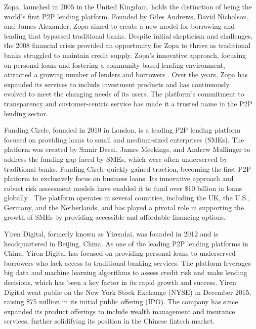 \documentclass{article}
\begin{document}
Zopa, launched in 2005 in the United Kingdom, holds the distinction of being the world's first P2P lending platform. Founded by Giles Andrews, David Nicholson, and James Alexander, Zopa aimed to create a new model for borrowing and lending that bypassed traditional banks. Despite initial skepticism and challenges, the 2008 financial crisis provided an opportunity for Zopa to thrive as traditional banks struggled to maintain credit supply. Zopa's innovative approach, focusing on personal loans and fostering a community-based lending environment, attracted a growing number of lenders and borrowers \citep{atz_peer--peer_2024}. Over the years, Zopa has expanded its services to include investment products and has continuously evolved to meet the changing needs of its users. The platform's commitment to transparency and customer-centric service has made it a trusted name in the P2P lending sector.

Funding Circle, founded in 2010 in London, is a leading P2P lending platform focused on providing loans to small and medium-sized enterprises (SMEs). The platform was created by Samir Desai, James Meekings, and Andrew Mullinger to address the funding gap faced by SMEs, which were often underserved by traditional banks. Funding Circle quickly gained traction, becoming the first P2P platform to exclusively focus on business loans. Its innovative approach and robust risk assessment models have enabled it to fund over \$10 billion in loans globally \citep{funding_circle_ltd_about_2023}. The platform operates in several countries, including the UK, the U.S., Germany, and the Netherlands, and has played a pivotal role in supporting the growth of SMEs by providing accessible and affordable financing options.

Yiren Digital, formerly known as Yirendai, was founded in 2012 and is headquartered in Beijing, China. As one of the leading P2P lending platforms in China, Yiren Digital has focused on providing personal loans to underserved borrowers who lack access to traditional banking services. The platform leverages big data and machine learning algorithms to assess credit risk and make lending decisions, which has been a key factor in its rapid growth and success. Yiren Digital went public on the New York Stock Exchange (NYSE) in December 2015, raising \$75 million in its initial public offering (IPO). The company has since expanded its product offerings to include wealth management and insurance services, further solidifying its position in the Chinese fintech market.
\end{document}
